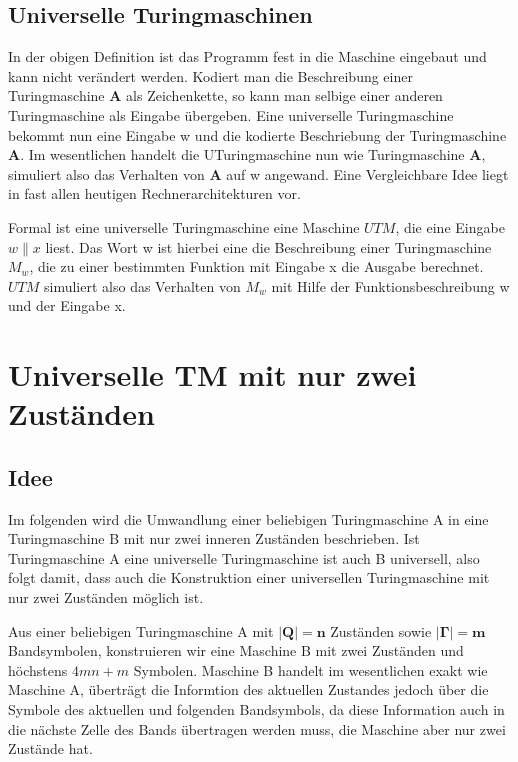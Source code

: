 \documentclass[12pt, a4paper]{article}
\begin{document}
 

\subsection{Universelle Turingmaschinen}



In der obigen Definition ist das Programm fest in die Maschine eingebaut und kann nicht verändert werden. Kodiert man die Beschreibung einer Turingmaschine \textbf{A} als Zeichenkette, so kann man selbige einer anderen Turingmaschine als Eingabe übergeben.
Eine universelle Turingmaschine bekommt nun eine Eingabe w und die kodierte Beschriebung der Turingmaschine \textbf{A}. Im wesentlichen handelt die UTuringmaschine nun wie Turingmaschine \textbf{A}, simuliert also das Verhalten von \textbf{A} auf w angewand.
Eine Vergleichbare Idee liegt in fast allen heutigen Rechnerarchitekturen vor.

Formal ist eine universelle Turingmaschine eine Maschine $UTM$, die eine Eingabe $  w \| x  $ liest. Das Wort w ist hierbei eine  die Beschreibung einer Turingmaschine $M_{w}$, die zu einer bestimmten Funktion mit Eingabe x die Ausgabe berechnet. $UTM$ simuliert also das Verhalten von $M_{w}$ mit Hilfe der Funktionsbeschreibung w und der Eingabe x.


\section{Universelle TM mit nur zwei Zuständen}
\subsection{Idee}

Im folgenden wird die Umwandlung einer beliebigen Turingmaschine A in eine Turingmaschine B mit nur zwei inneren Zuständen beschrieben. Ist Turingmaschine A eine universelle Turingmaschine ist auch B universell, also folgt damit, dass auch die Konstruktion einer universellen Turingmaschine mit nur zwei Zuständen möglich ist.

Aus einer beliebigen Turingmaschine A mit $\mathbf{|Q| = n}$ Zuständen sowie $\mathbf{|\Gamma| = m}$ Bandsymbolen, konstruieren wir eine Maschine B mit zwei Zuständen und höchstens $4mn + m$ Symbolen. Maschine B handelt im wesentlichen exakt wie Maschine A, überträgt die Informtion des aktuellen Zustandes jedoch über die Symbole des aktuellen und folgenden Bandsymbols, da diese Information auch in die nächste Zelle des Bands übertragen werden muss, die Maschine aber nur zwei Zustände hat.
\end{document}
